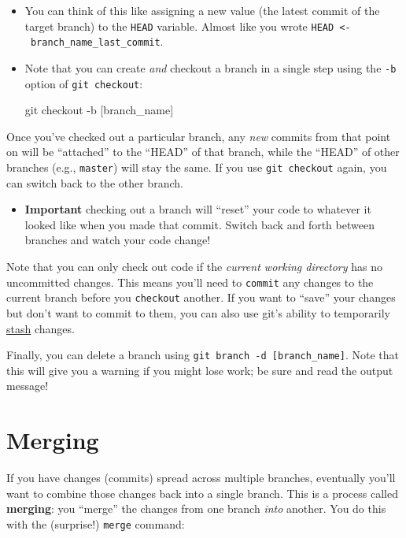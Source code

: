 \documentclass[]{book}
\newenvironment{Shaded}{\begin{snugshade}}{\end{snugshade}}
\newcommand{\FunctionTok}[1]{\textcolor[rgb]{0.00,0.00,0.00}{#1}}
\newcommand{\NormalTok}[1]{#1}
\providecommand{\tightlist}{%
  \setlength{\itemsep}{0pt}\setlength{\parskip}{0pt}}
\theoremstyle{definition}
\theoremstyle{definition}
\theoremstyle{remark}
\begin{document}
\begin{itemize}
\item
  You can think of this like assigning a new value (the latest commit of
  the target branch) to the \texttt{HEAD} variable. Almost like you
  wrote \texttt{HEAD\ \textless{}-\ branch\_name\_last\_commit}.
\item
  Note that you can create \emph{and} checkout a branch in a single step
  using the \texttt{-b} option of \texttt{git\ checkout}:

\begin{Shaded}
\begin{Highlighting}[]
\FunctionTok{git}\NormalTok{ checkout -b [branch_name]}
\end{Highlighting}
\end{Shaded}
\end{itemize}

Once you've checked out a particular branch, any \emph{new} commits from
that point on will be ``attached'' to the ``HEAD'' of that branch, while
the ``HEAD'' of other branches (e.g., \texttt{master}) will stay the
same. If you use \texttt{git\ checkout} again, you can switch back to
the other branch.

\begin{itemize}
\tightlist
\item
  \textbf{Important} checking out a branch will ``reset'' your code to
  whatever it looked like when you made that commit. Switch back and
  forth between branches and watch your code change!
\end{itemize}

Note that you can only check out code if the \emph{current working
directory} has no uncommitted changes. This means you'll need to
\texttt{commit} any changes to the current branch before you
\texttt{checkout} another. If you want to ``save'' your changes but
don't want to commit to them, you can also use git's ability to
temporarily
\href{https://git-scm.com/book/en/v2/Git-Tools-Stashing-and-Cleaning}{stash}
changes.

Finally, you can delete a branch using
\texttt{git\ branch\ -d\ {[}branch\_name{]}}. Note that this will give
you a warning if you might lose work; be sure and read the output
message!

\section{Merging}\label{merging}

If you have changes (commits) spread across multiple branches,
eventually you'll want to combine those changes back into a single
branch. This is a process called \textbf{merging}: you ``merge'' the
changes from one branch \emph{into} another. You do this with the
(surprise!) \texttt{merge} command:
\end{document}
